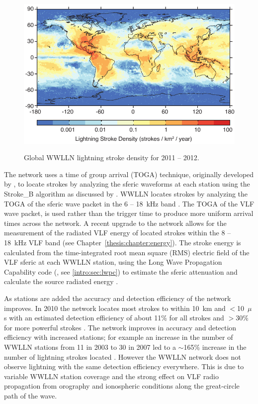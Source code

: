 \begin{figure}[ht!]
	\centering
	\includegraphics[scale=1]{Introduction/Figures/wwlln_density.pdf}\\
	\caption{Global WWLLN lightning stroke density for 2011 -- 2012.}
	\label{intro:fig:wwlln}
\end{figure}

The network uses a time of group arrival (TOGA) technique, originally developed by \citet{Dowden2002d}, to locate strokes by analyzing the sferic waveforms at each station using the Stroke\_B algorithm as discussed by \citet{Rodger2006,Rodger2009}.
WWLLN locates strokes by analyzing the TOGA of the sferic wave packet in the 6 -- 18~kHz band \citep{Dowden2000}.
The TOGA of the VLF wave packet, is used rather than the trigger time to produce more uniform arrival times across the network.
A recent upgrade to the network allows for the measurement of the radiated VLF energy of located strokes within the 8 -- 18~kHz VLF band (see Chapter~\ref{thesis:chapter:energy}).
The stroke energy is calculated from the time-integrated root mean square (RMS) electric field of the VLF sferic at each WWLLN station, using the Long Wave Propagation Capability code (\citet{Ferguson1998}, see \ref{intro:sec:lwpc}) to estimate the sferic attenuation and calculate the source radiated energy \citep{Hutchins2012}.

As stations are added the accuracy and detection efficiency of the network improves.
In 2010 the network locates most strokes to within 10~km and $<$10~$\mu$s with an estimated detection efficiency of about 11\% for all strokes and $>$30\% for more powerful strokes \citep{Abarca2010,Rodger2009}.
The network improves in accuracy and detection efficiency with increased stations; for example an increase in the number of WWLLN stations from 11 in 2003 to 30 in 2007 led to a $\sim$165\% increase in the number of lightning strokes located \citep{Rodger2009}.
However the WWLLN network does not observe lightning with the same detection efficiency everywhere.
This is due to variable WWLLN station coverage and the strong effect on VLF radio propagation from orography and ionospheric conditions along the great-circle path of the wave.

